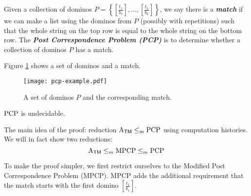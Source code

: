 Given a collection of dominos $\displaystyle P = \left\{ \left[ \frac{t_1}{b_1} \right], \ldots, \left[ \frac{t_k}{b_k} \right] \right\}$, we say there is a \textit{\textbf{match}} if we can make a list using the dominos from $P$ (possibly with repetitions) such that the whole string on the top row is equal to the whole string on the bottom row. The \textit{\textbf{Post Correspondence Problem (PCP)}} is to determine whether a collection of dominos $P$ has a match.

Figure \ref{fig:pcp-example} shows a set of dominos and a match.

\begin{figure}[htbp]
    \centering
    \texttt{[image: pcp-example.pdf]}
    \caption{A set of dominos $P$ and the corresponding match.}
    \label{fig:pcp-example}
\end{figure}

\begin{theorem}
    $\mathrm{PCP}$ is undecidable.
\end{theorem}

The main idea of the proof: reduction $\mathrm{A}_{\mathsf{TM}} \leq_m \mathrm{PCP}$ using computation histories. We will in fact show two reductions:
$$
\mathrm{A}_{\mathsf{TM}} \leq_m \mathrm{MPCP} \leq_m \mathrm{PCP}
$$

To make the proof simpler, we first restrict ourselves to the Modified Post Correspondence Problem (MPCP). MPCP adds the additional requirement that the match starts with the first domino $\left[ \frac{t_1}{b_1} \right]$.